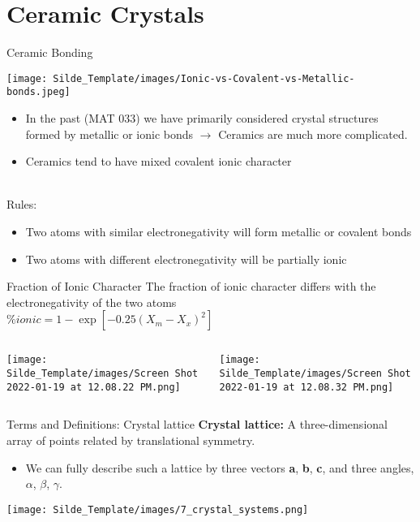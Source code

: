 \documentclass{libs/XJTLU_format}
\begin{document}
\section{Ceramic Crystals}
\begin{frame}{Ceramic Bonding}

\centering
\texttt{[image: Silde\_Template/images/Ionic-vs-Covalent-vs-Metallic-bonds.jpeg]}

    \begin{itemize}
        \item In the past (MAT 033) we have primarily considered crystal structures formed by metallic or ionic bonds $\rightarrow$ Ceramics are much more complicated. \pause
        \item Ceramics tend to have mixed covalent ionic character\pause
    \end{itemize}\\

    \justifying
    Rules: 
    \begin{itemize}
        \item Two atoms with similar electronegativity will form metallic or covalent bonds \pause
        \item Two atoms with different electronegativity will be partially ionic \pause
    \end{itemize}
\end{frame}

\begin{frame}{Fraction of Ionic Character}
The fraction of ionic character differs with the electronegativity of the two atoms\\[0.3em]
\centering
$\% ionic = 1-\exp[-0.25(X_m - X_x)^2]$
\pause

\begin{columns}{\textwidth}
      \begin{column}{0.5\textwidth}
      \centering
      \texttt{[image: Silde\_Template/images/Screen Shot 2022-01-19 at 12.08.22 PM.png]}
      \end{column}
      \begin{column}{0.5\textwidth}
          \centering
          \texttt{[image: Silde\_Template/images/Screen Shot 2022-01-19 at 12.08.32 PM.png]}
      \end{column}
  \end{columns}
\end{frame}

\begin{frame}{Terms and Definitions: Crystal lattice}
\textbf{Crystal lattice:} A three-dimensional array of points related by translational symmetry. 
\pause
\begin{itemize}
    \item We can fully describe such a lattice by
three vectors \textbf{a}, \textbf{b}, \textbf{c}, and three angles, $\alpha$, $\beta$, $\gamma$.
\end{itemize}
\pause
\centering         \texttt{[image: Silde\_Template/images/7\_crystal\_systems.png]}

\end{frame}
\end{document}
